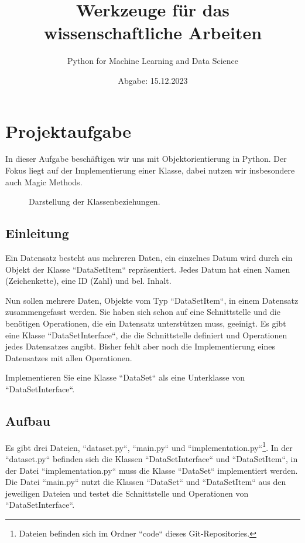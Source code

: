 \documentclass[12pt]{article}
\title{Werkzeuge für das wissenschaftliche Arbeiten}
\date{Abgabe: 15.12.2023}
\author{Python for Machine Learning and Data Science}
\begin{document}
\maketitle
\tableofcontents

\section{Projektaufgabe}
In dieser Aufgabe beschäftigen wir uns mit Objektorientierung in Python.
Der Fokus liegt auf der Implementierung einer Klasse, dabei nutzen wir insbesondere auch Magic Methods.

\begin{figure}[htbp]
    \centering
    
    \caption{Darstellung der Klassenbeziehungen.}
\end{figure}
\subsection{Einleitung}
Ein Datensatz besteht aus mehreren Daten, ein einzelnes Datum wird durch ein Objekt der Klasse ``DataSetItem`` repräsentiert.
Jedes Datum hat einen Namen (Zeichenkette), eine ID (Zahl) und bel. Inhalt.

Nun sollen mehrere Daten, Objekte vom Typ ``DataSetItem``, in einem Datensatz zusammengefasst werden.
Sie haben sich schon auf eine Schnittstelle und die benötigen Operationen, die ein Datensatz unterstützen muss, geeinigt.
Es gibt eine Klasse ``DataSetInterface``, die die Schnittstelle definiert und Operationen jedes Datensatzes angibt.
Bisher fehlt aber noch die Implementierung eines Datensatzes mit allen Operationen.

Implementieren Sie eine Klasse ``DataSet`` als eine Unterklasse von ``DataSetInterface``.

\subsection{Aufbau}
Es gibt drei Dateien, ``dataset.py``, ``main.py`` und ``implementation.py``\footnote{Dateien befinden sich im Ordner ``code`` dieses Git-Repositories.}.
In der ``dataset.py`` befinden sich die Klassen ``DataSetInterface`` und ``DataSetItem``,
in der Datei ``implementation.py`` muss die Klasse ``DataSet`` implementiert werden.
Die Datei ``main.py`` nutzt die Klassen ``DataSet`` und ``DataSetItem`` aus den jeweiligen Dateien und testet die Schnittstelle und Operationen von ``DataSetInterface``.
\end{document}
